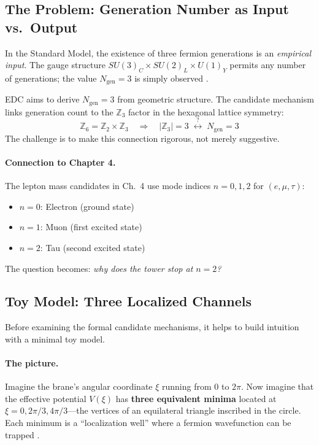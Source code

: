 \subsection{The Problem: Generation Number as Input vs.\ Output}
\label{sec:ch5_problem}

In the Standard Model, the existence of three fermion generations is an
\emph{empirical input}. The gauge structure $SU(3)_C \times SU(2)_L \times U(1)_Y$
permits any number of generations; the value $N_{\text{gen}} = 3$ is simply
observed \tagBL{}.

EDC aims to derive $N_{\text{gen}} = 3$ from geometric structure. The candidate
mechanism links generation count to the $\mathbb{Z}_3$ factor in the hexagonal
lattice symmetry:
\begin{equation}
    \mathbb{Z}_6 = \mathbb{Z}_2 \times \mathbb{Z}_3
    \quad\Longrightarrow\quad
    |\mathbb{Z}_3| = 3 \;\stackrel{?}{\longleftrightarrow}\; N_{\text{gen}} = 3
    \label{eq:ch5_z6_factor}
\end{equation}
The challenge is to make this connection rigorous, not merely suggestive.

\paragraph{Connection to Chapter 4.}
The lepton mass candidates in Ch.~4 use mode indices $n = 0, 1, 2$ for
$(e, \mu, \tau)$:
\begin{itemize}[nosep]
    \item $n = 0$: Electron (ground state)
    \item $n = 1$: Muon (first excited state)
    \item $n = 2$: Tau (second excited state)
\end{itemize}
The question becomes: \emph{why does the tower stop at $n = 2$?}

\subsection{Toy Model: Three Localized Channels}
\label{sec:ch5_toy_model}

Before examining the formal candidate mechanisms, it helps to build intuition
with a minimal toy model.

\paragraph{The picture.}
Imagine the brane's angular coordinate $\xi$ running from $0$ to $2\pi$.
Now imagine that the effective potential $V(\xi)$ has \textbf{three equivalent
minima} located at $\xi = 0, 2\pi/3, 4\pi/3$---the vertices of an equilateral
triangle inscribed in the circle. Each minimum is a ``localization well''
where a fermion wavefunction can be trapped \tagP{}.

